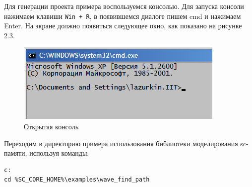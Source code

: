 Для генерации проекта примера воспользуемся консолью. Для запуска
консоли нажимаем клавиши \verb|Win + R|, в появившемся диалоге пишем cmd и
нажимаем Enter. На экране должно появиться следующее окно, как
показано на рисунке 2.3.

\begin{figure}[h]
  \centering
  \includegraphics[scale=0.7]{images/4/setup/Run_console}
  \caption{Открытая консоль}
  \label{fig:Run_console}
\end{figure}

Переходим в директорию примера использования библиотеки моделирования
sc-памяти, используя команды:
\begin{verbatim}
c: 
cd %SC_CORE_HOME%\examples\wave_find_path
\end{verbatim}




